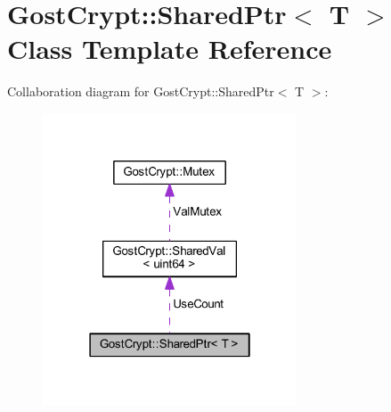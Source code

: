 \hypertarget{class_gost_crypt_1_1_shared_ptr}{}\section{Gost\+Crypt\+:\+:Shared\+Ptr$<$ T $>$ Class Template Reference}
\label{class_gost_crypt_1_1_shared_ptr}


Collaboration diagram for Gost\+Crypt\+:\+:Shared\+Ptr$<$ T $>$\+:
\nopagebreak
\begin{figure}[H]
\begin{center}
\leavevmode
\includegraphics[width=214pt]{class_gost_crypt_1_1_shared_ptr__coll__graph}
\end{center}
\end{figure}
